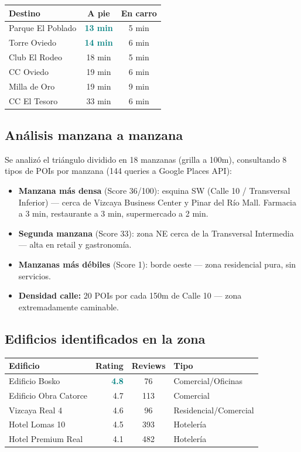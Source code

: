 \documentclass[11pt, a4paper]{article}
\newcommand{\highlight}[1]{\textcolor{teal}{\textbf{#1}}}
\begin{document}
\begin{center}
\begin{tabular}{@{}lcc@{}}
\toprule
\textbf{Destino} & \textbf{A pie} & \textbf{En carro} \\
\midrule
Parque El Poblado & \highlight{13 min} & 5 min \\
Torre Oviedo & \highlight{14 min} & 6 min \\
Club El Rodeo & 18 min & 5 min \\
CC Oviedo & 19 min & 6 min \\
Milla de Oro & 19 min & 9 min \\
CC El Tesoro & 33 min & 6 min \\
\bottomrule
\end{tabular}
\end{center}

\subsection{An\'{a}lisis manzana a manzana}

Se analiz\'{o} el tri\'{a}ngulo dividido en 18 manzanas (grilla a 100m), consultando 8 tipos de POIs por manzana (144 queries a Google Places API):

\begin{itemize}
  \item \textbf{Manzana m\'{a}s densa} (Score 36/100): esquina SW (Calle 10 / Transversal Inferior) — cerca de Vizcaya Business Center y Pinar del R\'{i}o Mall. Farmacia a 3 min, restaurante a 3 min, supermercado a 2 min.
  \item \textbf{Segunda manzana} (Score 33): zona NE cerca de la Transversal Intermedia — alta en retail y gastronom\'{i}a.
  \item \textbf{Manzanas m\'{a}s d\'{e}biles} (Score 1): borde oeste — zona residencial pura, sin servicios.
  \item \textbf{Densidad calle:} 20 POIs por cada 150m de Calle 10 — zona extremadamente caminable.
\end{itemize}

\subsection{Edificios identificados en la zona}

\begin{center}
\small
\begin{tabular}{@{}lrcl@{}}
\toprule
\textbf{Edificio} & \textbf{Rating} & \textbf{Reviews} & \textbf{Tipo} \\
\midrule
Edificio Bosko & \highlight{4.8} & 76 & Comercial/Oficinas \\
Edificio Obra Catorce & 4.7 & 113 & Comercial \\
Vizcaya Real 4 & 4.6 & 96 & Residencial/Comercial \\
Hotel Lomas 10 & 4.5 & 393 & Hoteler\'{i}a \\
Hotel Premium Real & 4.1 & 482 & Hoteler\'{i}a \\
\bottomrule
\end{tabular}
\end{center}
\end{document}
